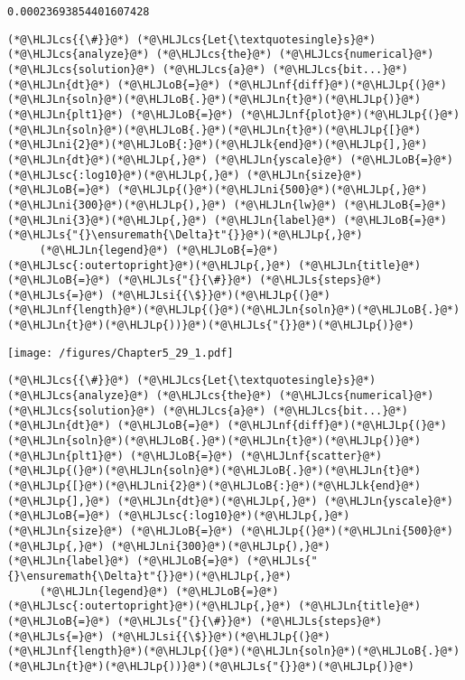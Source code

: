 \documentclass[12pt,a4paper]{article}
\newcommand{\HLJLk}[1]{\textcolor[RGB]{148,91,176}{\textbf{#1}}}
\newcommand{\HLJLn}[1]{#1}
\newcommand{\HLJLnf}[1]{\textcolor[RGB]{66,102,213}{#1}}
\newcommand{\HLJLs}[1]{\textcolor[RGB]{201,61,57}{#1}}
\newcommand{\HLJLsc}[1]{\textcolor[RGB]{201,61,57}{#1}}
\newcommand{\HLJLsi}[1]{#1}
\newcommand{\HLJLni}[1]{\textcolor[RGB]{59,151,46}{#1}}
\newcommand{\HLJLoB}[1]{\textcolor[RGB]{102,102,102}{\textbf{#1}}}
\newcommand{\HLJLp}[1]{#1}
\newcommand{\HLJLcs}[1]{\textcolor[RGB]{153,153,119}{\textit{#1}}}
\begin{document}
\begin{lstlisting}
0.00023693854401607428
\end{lstlisting}


\begin{lstlisting}
(*@\HLJLcs{{\#}}@*) (*@\HLJLcs{Let{\textquotesingle}s}@*) (*@\HLJLcs{analyze}@*) (*@\HLJLcs{the}@*) (*@\HLJLcs{numerical}@*) (*@\HLJLcs{solution}@*) (*@\HLJLcs{a}@*) (*@\HLJLcs{bit...}@*)
(*@\HLJLn{dt}@*) (*@\HLJLoB{=}@*) (*@\HLJLnf{diff}@*)(*@\HLJLp{(}@*)(*@\HLJLn{soln}@*)(*@\HLJLoB{.}@*)(*@\HLJLn{t}@*)(*@\HLJLp{)}@*)
(*@\HLJLn{plt1}@*) (*@\HLJLoB{=}@*) (*@\HLJLnf{plot}@*)(*@\HLJLp{(}@*)(*@\HLJLn{soln}@*)(*@\HLJLoB{.}@*)(*@\HLJLn{t}@*)(*@\HLJLp{[}@*)(*@\HLJLni{2}@*)(*@\HLJLoB{:}@*)(*@\HLJLk{end}@*)(*@\HLJLp{],}@*) (*@\HLJLn{dt}@*)(*@\HLJLp{,}@*) (*@\HLJLn{yscale}@*) (*@\HLJLoB{=}@*) (*@\HLJLsc{:log10}@*)(*@\HLJLp{,}@*) (*@\HLJLn{size}@*) (*@\HLJLoB{=}@*) (*@\HLJLp{(}@*)(*@\HLJLni{500}@*)(*@\HLJLp{,}@*) (*@\HLJLni{300}@*)(*@\HLJLp{),}@*) (*@\HLJLn{lw}@*) (*@\HLJLoB{=}@*) (*@\HLJLni{3}@*)(*@\HLJLp{,}@*) (*@\HLJLn{label}@*) (*@\HLJLoB{=}@*) (*@\HLJLs{"{}\ensuremath{\Delta}t"{}}@*)(*@\HLJLp{,}@*) 
     (*@\HLJLn{legend}@*) (*@\HLJLoB{=}@*) (*@\HLJLsc{:outertopright}@*)(*@\HLJLp{,}@*) (*@\HLJLn{title}@*) (*@\HLJLoB{=}@*) (*@\HLJLs{"{}{\#}}@*) (*@\HLJLs{steps}@*) (*@\HLJLs{=}@*) (*@\HLJLsi{{\$}}@*)(*@\HLJLp{(}@*)(*@\HLJLnf{length}@*)(*@\HLJLp{(}@*)(*@\HLJLn{soln}@*)(*@\HLJLoB{.}@*)(*@\HLJLn{t}@*)(*@\HLJLp{))}@*)(*@\HLJLs{"{}}@*)(*@\HLJLp{)}@*)
\end{lstlisting}

\texttt{[image: /figures/Chapter5\_29\_1.pdf]}

\begin{lstlisting}
(*@\HLJLcs{{\#}}@*) (*@\HLJLcs{Let{\textquotesingle}s}@*) (*@\HLJLcs{analyze}@*) (*@\HLJLcs{the}@*) (*@\HLJLcs{numerical}@*) (*@\HLJLcs{solution}@*) (*@\HLJLcs{a}@*) (*@\HLJLcs{bit...}@*)
(*@\HLJLn{dt}@*) (*@\HLJLoB{=}@*) (*@\HLJLnf{diff}@*)(*@\HLJLp{(}@*)(*@\HLJLn{soln}@*)(*@\HLJLoB{.}@*)(*@\HLJLn{t}@*)(*@\HLJLp{)}@*)
(*@\HLJLn{plt1}@*) (*@\HLJLoB{=}@*) (*@\HLJLnf{scatter}@*)(*@\HLJLp{(}@*)(*@\HLJLn{soln}@*)(*@\HLJLoB{.}@*)(*@\HLJLn{t}@*)(*@\HLJLp{[}@*)(*@\HLJLni{2}@*)(*@\HLJLoB{:}@*)(*@\HLJLk{end}@*)(*@\HLJLp{],}@*) (*@\HLJLn{dt}@*)(*@\HLJLp{,}@*) (*@\HLJLn{yscale}@*) (*@\HLJLoB{=}@*) (*@\HLJLsc{:log10}@*)(*@\HLJLp{,}@*) (*@\HLJLn{size}@*) (*@\HLJLoB{=}@*) (*@\HLJLp{(}@*)(*@\HLJLni{500}@*)(*@\HLJLp{,}@*) (*@\HLJLni{300}@*)(*@\HLJLp{),}@*)  (*@\HLJLn{label}@*) (*@\HLJLoB{=}@*) (*@\HLJLs{"{}\ensuremath{\Delta}t"{}}@*)(*@\HLJLp{,}@*) 
     (*@\HLJLn{legend}@*) (*@\HLJLoB{=}@*) (*@\HLJLsc{:outertopright}@*)(*@\HLJLp{,}@*) (*@\HLJLn{title}@*) (*@\HLJLoB{=}@*) (*@\HLJLs{"{}{\#}}@*) (*@\HLJLs{steps}@*) (*@\HLJLs{=}@*) (*@\HLJLsi{{\$}}@*)(*@\HLJLp{(}@*)(*@\HLJLnf{length}@*)(*@\HLJLp{(}@*)(*@\HLJLn{soln}@*)(*@\HLJLoB{.}@*)(*@\HLJLn{t}@*)(*@\HLJLp{))}@*)(*@\HLJLs{"{}}@*)(*@\HLJLp{)}@*)
\end{lstlisting}
\end{document}
